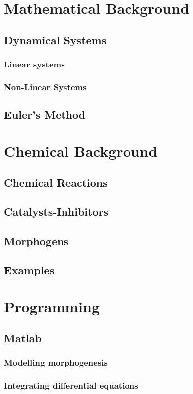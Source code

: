 \documentclass[12pt,a4paper]{report}
\begin{document}
\chapter{Mathematical Background}
	\section{Dynamical Systems}
	\subsection{Linear systems}
	\subsection{Non-Linear Systems}
	\section{Euler's Method}
\chapter{Chemical Background}
	\section{Chemical Reactions}
	\section{Catalysts-Inhibitors}
	\section{Morphogens}
	\section{Examples}
	
\chapter{Programming}
	\section{Matlab}
	\subsection{Modelling morphogenesis}	
	\subsection{Integrating differential equations}
\end{document}
